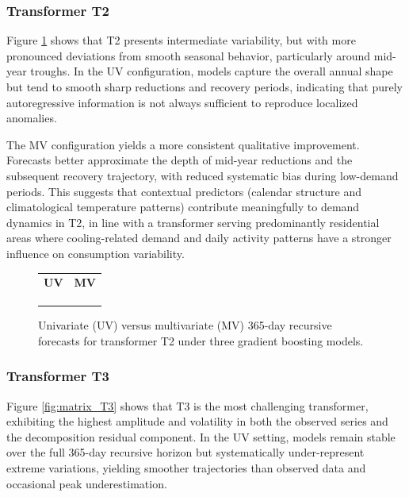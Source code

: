\subsubsection{Transformer T2}
Figure \ref{fig:matrix_T2} shows that T2 presents intermediate variability, but with more pronounced deviations from smooth seasonal behavior, particularly around mid-year troughs. In the UV configuration, models capture the overall annual shape but tend to smooth sharp reductions and recovery periods, indicating that purely autoregressive information is not always sufficient to reproduce localized anomalies.

The MV configuration yields a more consistent qualitative improvement. Forecasts better approximate the depth of mid-year reductions and the subsequent recovery trajectory, with reduced systematic bias during low-demand periods. This suggests that contextual predictors (calendar structure and climatological temperature patterns) contribute meaningfully to demand dynamics in T2, in line with a transformer serving predominantly residential areas where cooling-related demand and daily activity patterns have a stronger influence on consumption variability.

\begin{figure}[!h]
\centering
\setlength{\tabcolsep}{3pt}
\renewcommand{\arraystretch}{1.0}
\begin{tabular}{cc}
\textbf{UV} & \textbf{MV} \\
 &
 \\
 &
 \\
 &
 \\
\end{tabular}
\caption{Univariate (UV) versus multivariate (MV) 365-day recursive forecasts for transformer T2 under three gradient boosting models.}
\label{fig:matrix_T2}
\end{figure}

\subsubsection{Transformer T3}
Figure \ref{fig:matrix_T3} shows that T3 is the most challenging transformer, exhibiting the highest amplitude and volatility in both the observed series and the decomposition residual component. In the UV setting, models remain stable over the full 365-day recursive horizon but systematically under-represent extreme variations, yielding smoother trajectories than observed data and occasional peak underestimation.

